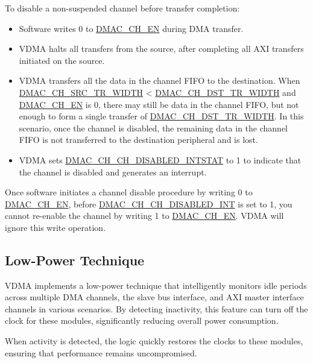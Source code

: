 \documentclass[main\_\_EN.tex]{subfiles}
\begin{document}
To disable a non-suspended channel before transfer completion:

\begin{itemize}
    \item Software writes 0 to \hyperref[fielddesc:DMACCH1EN]{DMAC\_CH\_EN} during DMA transfer.
    \item VDMA halts all transfers from the source, after completing all AXI transfers initiated on the source.
    \item VDMA transfers all the data in the channel FIFO to the destination. When \hyperref[fielddesc:DMACCHNSRCTRWIDTH]{DMAC\_CH\_SRC\_TR\_WIDTH} < \hyperref[fielddesc:DMACCHNDSTTRWIDTH]{DMAC\_CH\_DST\_TR\_WIDTH} and \hyperref[fielddesc:DMACCH1EN]{DMAC\_CH\_EN} is 0, there may still be data in the channel FIFO, but not enough to form a single transfer of \hyperref[fielddesc:DMACCHNDSTTRWIDTH]{DMAC\_CH\_DST\_TR\_WIDTH}.
    In this scenario, once the channel is disabled, the remaining data in the channel FIFO is not transferred to the destination peripheral and is lost.
    \item VDMA sets \hyperref[fielddesc:DMACCHNCHDISABLEDINTSTAT]{DMAC\_CH\_CH\_DISABLED\_INTSTAT} to 1 to indicate that the channel is disabled and generates an interrupt.
\end{itemize}

\begin{tiplisting}
    Once software initiates a channel disable procedure by writing 0 to \hyperref[fielddesc:DMACCH1EN]{DMAC\_CH\_EN}, before \hyperref[int:DMACCHNCHDISABLEDINT]{DMAC\_CH\_CH\_DISABLED\_INT} is set to 1, you cannot re-enable the channel by writing 1 to \hyperref[fielddesc:DMACCH1EN]{DMAC\_CH\_EN}. VDMA will ignore this write operation.
\end{tiplisting}

\subsection{Low-Power Technique}

VDMA implements a low-power technique that intelligently monitors idle periods across multiple DMA channels, the slave bus interface, and AXI master interface channels in various scenarios. By detecting inactivity, this feature can turn off the clock for these modules, significantly reducing overall power consumption.

When activity is detected, the logic quickly restores the clocks to these modules, ensuring that performance remains uncompromised.
\end{document}
